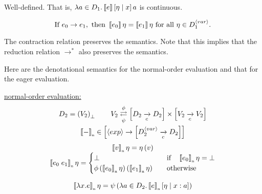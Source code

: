 \begin{enumcirc}
\[\begin{array}{c}
		\end{array}
	\]
	\begin{property}[Textbook 10.8]
		\;\\
		Well-defined. That is,
		$\lambda a \in D_1 . \left\llbracket e \right\rrbracket\left[ \eta \; \middle\vert \; x \right]{a}$
		is continuous.
	\end{property}
	\begin{property}
		\[
			\textrm{If } e_0 \rightarrow e_1, \textrm{ then }
			\left\llbracket e_0 \right\rrbracket\eta = \left\llbracket e_1 \right\rrbracket\eta \textrm{ for all } \eta \in D_1^{\left\langle var \right\rangle}.
		\]
	\end{property}
	The contraction relation preserves the semantics.
	Note that this implies that the reduction relation $\rightarrow^*$ also
	preserves the semantics.
	\item
	Here are the denotational semantics for the normal-order evaluation and that
	for the eager evaluation.

	\ul{normal-order evaluation:}
	\[
		\begin{array}{c}
			\displaystyle
			D_2 = \left( V_2 \right)_\bot \qquad
			V_2 \mathrel{\mathop{\rightleftarrows}^{\mathrm{\phi}}_{\mathrm{\psi}}} \left[ D_2 \xrightarrow[c]{} D_2 \right] \times \left[ V_2 \xrightarrow[c]{} V_2 \right]                                                                      \\[1em]
			\left\llbracket - \right\rrbracket_{\textrm{\tiny n}} \in \left[ \left\langle exp \right\rangle \rightarrow \left[  D_2^{\left\langle var \right\rangle} \xrightarrow[c]{} D_2  \right] \right]                                                         \\[1em]
			\left\llbracket v \right\rrbracket_{\textrm{\tiny n}}\eta = \eta\left( v \right)                                                                                                                          \\
			\left\llbracket e_0 \; e_1 \right\rrbracket_{\textrm{\tiny n}}\eta = \begin{cases}
				                             \bot                                                       & \quad \textrm{if} \quad \left\llbracket e_0 \right\rrbracket_{\textrm{\tiny n}}\eta = \bot \\
				                             \phi\left( \left\llbracket e_0 \right\rrbracket_{\textrm{\tiny n}}\eta \right)\left( \left\llbracket e_1 \right\rrbracket_{\textrm{\tiny n}}\eta \right) & \quad \textrm{otherwise}                           \\
			                             \end{cases} \\[2em]
			\left\llbracket \lambda x. e \right\rrbracket_{\textrm{\tiny n}}\eta = \psi\left( \lambda a \in D_2 . \left\llbracket e \right\rrbracket_{\textrm{\tiny n}}\left[ \eta \; \middle\vert \; x:a \right] \right)                                                                \\
		\end{array}
	\]


\end{enumcirc}
